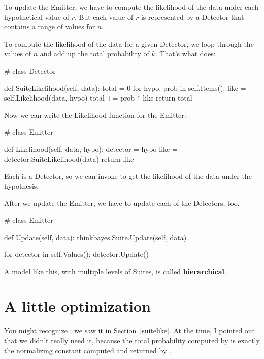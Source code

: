 \documentclass[12pt]{book}
\theoremstyle{exercise}
\begin{document}
To update the Emitter, we have to compute the likelihood of the data
under each hypothetical value of $r$.  But each value of $r$ is
represented by a Detector that contains a range of values for $n$.

To compute the likelihood of the data for a given Detector, we loop
through the values of $n$ and add up the total probability of $k$.
That's what  does:

\begin{code}
# class Detector

    def SuiteLikelihood(self, data):
        total = 0
        for hypo, prob in self.Items():
            like = self.Likelihood(data, hypo)
            total += prob * like
        return total
\end{code}

Now we can write the Likelihood function for the Emitter:

\begin{code}
# class Emitter

    def Likelihood(self, data, hypo):
        detector = hypo
        like = detector.SuiteLikelihood(data)
        return like
\end{code}

Each  is a Detector, so we can invoke
 to get the likelihood of the data under
the hypothesis.

After we update the Emitter, we have to update each of the
Detectors, too.  

\begin{code}
# class Emitter

    def Update(self, data):
        thinkbayes.Suite.Update(self, data)
        
        for detector in self.Values():
            detector.Update()
\end{code}

A model like this, with multiple levels of Suites, is called {\bf
  hierarchical}.  


\section{A little optimization}

You might recognize ; we saw it
in Section~\ref{suitelike}.  At the time, I pointed out that
we didn't really need it, because the total probability
computed by  is exactly the normalizing
constant computed and returned by .
 
\end{document}
